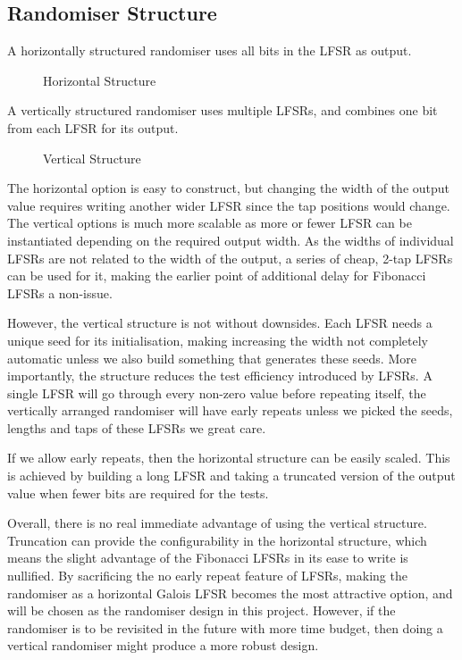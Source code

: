 \subsection{Randomiser Structure}

A horizontally structured randomiser uses all bits in the LFSR as output.

\begin{figure}[H]
  \centering
  
  \caption{Horizontal Structure}
  \label{HoriLFSR}
\end{figure}

A vertically structured randomiser uses multiple LFSRs, and combines one bit from each LFSR for its output.

\begin{figure}[H]
  \centering
  
  \caption{Vertical Structure}
  \label{VertLFSR}
\end{figure}

The horizontal option is easy to construct, but changing the width of the output value requires writing another wider LFSR since the tap positions would change.
The vertical options is much more scalable as more or fewer LFSR can be instantiated depending on the required output width.
As the widths of individual LFSRs are not related to the width of the output, a series of cheap, 2-tap LFSRs can be used for it, making the earlier point of additional delay for Fibonacci LFSRs a non-issue.

However, the vertical structure is not without downsides.
Each LFSR needs a unique seed for its initialisation, making increasing the width not completely automatic unless we also build something that generates these seeds.
More importantly, the structure reduces the test efficiency introduced by LFSRs.
A single LFSR will go through every non-zero value before repeating itself, the vertically arranged randomiser will have early repeats unless we picked the seeds, lengths and taps of these LFSRs we great care.

If we allow early repeats, then the horizontal structure can be easily scaled.
This is achieved by building a long LFSR and taking a truncated version of the output value when fewer bits are required for the tests.

Overall, there is no real immediate advantage of using the vertical structure.
Truncation can provide the configurability in the horizontal structure, which means the slight advantage of the Fibonacci LFSRs in its ease to write is nullified.
By sacrificing the no early repeat feature of LFSRs, making the randomiser as a horizontal Galois LFSR becomes the most attractive option, and will be chosen as the randomiser design in this project.
However, if the randomiser is to be revisited in the future with more time budget, then doing a vertical randomiser might produce a more robust design.

